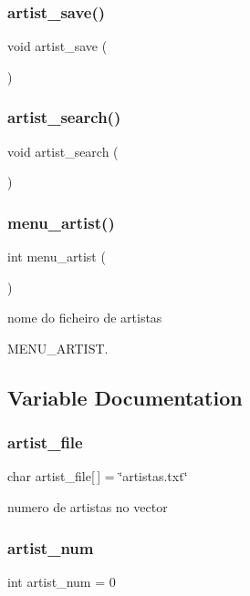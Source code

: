 \subsubsection{artist\_save()}
{\footnotesize\ttfamily void artist\+\_\+save (\begin{DoxyParamCaption}{ }\end{DoxyParamCaption})}

\mbox{\label{menu__artist_8c_ac92bcae8044b83bc1a51fa19509f1979}} 
\subsubsection{artist\_search()}
{\footnotesize\ttfamily void artist\+\_\+search (\begin{DoxyParamCaption}{ }\end{DoxyParamCaption})}

\mbox{\label{menu__artist_8c_a7c5e73158caf3dee7454843b4bb18325}} 
\subsubsection{menu\_artist()}
{\footnotesize\ttfamily int menu\+\_\+artist (\begin{DoxyParamCaption}{ }\end{DoxyParamCaption})}



nome do ficheiro de artistas 

M\+E\+N\+U\+\_\+\+A\+R\+T\+I\+ST. 

\subsection{Variable Documentation}
\mbox{\label{menu__artist_8c_ae03497d4c5787584c1e6cf070ecf983a}} 
\subsubsection{artist\_file}
{\footnotesize\ttfamily char artist\+\_\+file[$\,$] = \char`\"{}artistas.\+txt\char`\"{}}



numero de artistas no vector 

\mbox{\label{menu__artist_8c_a8d82d06e41678bc11a48e87a03a015c4}} 
\subsubsection{artist\_num}
{\footnotesize\ttfamily int artist\+\_\+num = 0}

